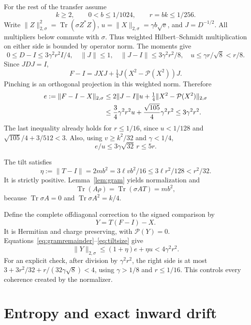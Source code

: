 \documentclass[11pt]{article}
\newcommand{\Tr}{\operatorname{Tr}}
\newcommand{\norm}[1]{\lVert #1\rVert}
\newcommand{\pin}{\mathcal P}
\newcommand{\wn}[1]{\lVert #1\rVert_{2,\sigma}}
\begin{document}
For the rest of the transfer assume
\begin{equation}\label{eq:window}
 k\ge2,\qquad 0<b\le1/1024,\qquad r=bk\le1/256.
\end{equation}
Write \(\wn{Z}^2=\Tr(\sigma Z^*Z)\),
\(u=\wn X=\gamma b\sqrt v\), and \(J=D^{-1/2}\).
All multipliers below commute with \(\sigma\). Thus weighted
Hilbert--Schmidt multiplication on either side is bounded by operator norm.
The moments give
\[
 0\le D-I\le3\gamma^2r^2I/4,\quad
 \norm J\le1,\quad\norm{J-I}\le3\gamma^2r^2/8,
 \quad u\le\gamma r/\sqrt8<r/8.
\]
Since \(JDJ=I\),
\[
 F-I=JXJ+\tfrac14J(X^2-\pin(X^2))J.
\]
Pinching is an orthogonal projection in this weighted norm. Therefore
\begin{align}
 e:=\wn{F-I-X}
 &\le2\norm{J-I}u+\tfrac14\wn{X^2-\pin(X^2)}\notag\\
 &\le\frac34\gamma^2r^2u+\frac{\sqrt{105}}4\gamma^2r^2
 \le3\gamma^2r^2.\label{eq:gramremainder}
\end{align}
The last inequality already holds for \(r\le1/16\), since
\(u<1/128\) and \(\sqrt{105}/4+3/512<3\).
Also, using \(v\ge k^2/32\) and \(\gamma<1/4\),
\begin{equation}\label{eq:relativeerror}
 e/u\le3\gamma\sqrt{32}\,r\le5r.
\end{equation}

The tilt satisfies
\begin{equation}\label{eq:tiltsize}
 \eta:=\norm{T-I}=2mb^2=3\ell vb^2/16
 \le3\ell r^2/128<r^2/32.
\end{equation}
It is strictly positive. Lemma~\ref{lem:gram} yields normalization and
\[
 \Tr(A\rho)=\Tr(\sigma AT)=mb^2,
\]
because \(\Tr\sigma A=0\) and \(\Tr\sigma A^2=k/4\).

Define the complete offdiagonal correction to the signed comparison by
\[
 Y=T(F-I)-X.
\]
It is Hermitian and charge preserving, with \(\pin(Y)=0\).
Equations~\eqref{eq:gramremainder}--\eqref{eq:tiltsize} give
\begin{equation}\label{eq:Ybudget}
 \wn Y\le(1+\eta)e+\eta u<4\gamma^2r^2.
\end{equation}
For an explicit check, after division by \(\gamma^2r^2\), the right side
is at most
\(3+3r^2/32+r/(32\gamma\sqrt8)<4\), using \(\gamma>1/8\)
and \(r\le1/16\). This controls every coherence created by the normalizer.

\section{Entropy and exact inward drift}
\end{document}
